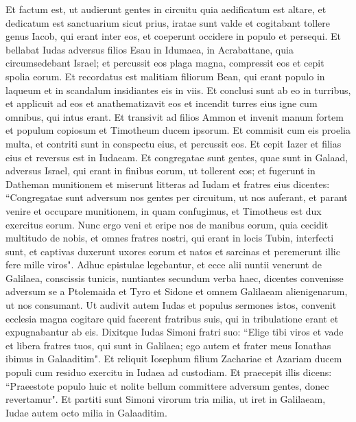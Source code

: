 \begin{biblechapter}  
\verse Et factum est, ut audierunt gentes in circuitu quia aedificatum est altare, et dedicatum est sanctuarium sicut prius, iratae sunt valde 
\verse et cogitabant tollere genus Iacob, qui erant inter eos, et coeperunt occidere in populo et persequi. 
\verse Et bellabat Iudas adversus filios Esau in Idumaea, in Acrabattane, quia circumsedebant Israel; et percussit eos plaga magna, compressit eos et cepit spolia eorum. 
\verse Et recordatus est malitiam filiorum Bean, qui erant populo in laqueum et in scandalum insidiantes eis in viis. 
\verse Et conclusi sunt ab eo in turribus, et applicuit ad eos et anathematizavit eos et incendit turres eius igne cum omnibus, qui intus erant. 
\verse Et transivit ad filios Ammon et invenit manum fortem et populum copiosum et Timotheum ducem ipsorum. 
\verse Et commisit cum eis proelia multa, et contriti sunt in conspectu eius, et percussit eos. 
\verse Et cepit Iazer et filias eius et reversus est in Iudaeam. 
\verse Et congregatae sunt gentes, quae sunt in Galaad, adversus Israel, qui erant in finibus eorum, ut tollerent eos; et fugerunt in Datheman munitionem 
\verse et miserunt litteras ad Iudam et fratres eius dicentes: “Congregatae sunt adversum nos gentes per circuitum, ut nos auferant, 
\verse et parant venire et occupare munitionem, in quam confugimus, et Timotheus est dux exercitus eorum. 
\verse Nunc ergo veni et eripe nos de manibus eorum, quia cecidit multitudo de nobis, 
\verse et omnes fratres nostri, qui erant in locis Tubin, interfecti sunt, et captivas duxerunt uxores eorum et natos et sarcinas et peremerunt illic fere mille viros". 
\verse Adhuc epistulae legebantur, et ecce alii nuntii venerunt de Galilaea, conscissis tunicis, nuntiantes secundum verba haec, 
\verse dicentes convenisse adversum se a Ptolemaida et Tyro et Sidone et omnem Galilaeam alienigenarum, ut nos consumant. 
\verse Ut audivit autem Iudas et populus sermones istos, convenit ecclesia magna cogitare quid facerent fratribus suis, qui in tribulatione erant et expugnabantur ab eis. 
\verse Dixitque Iudas Simoni fratri suo: “Elige tibi viros et vade et libera fratres tuos, qui sunt in Galilaea; ego autem et frater meus Ionathas ibimus in Galaaditim". 
\verse Et reliquit Iosephum filium Zachariae et Azariam ducem populi cum residuo exercitu in Iudaea ad custodiam.  
\verse Et praecepit illis dicens: “Praeestote populo huic et nolite bellum committere adversum gentes, donec revertamur". 
\verse Et partiti sunt Simoni virorum tria milia, ut iret in Galilaeam, Iudae autem octo milia in Galaaditim.  

\end{biblechapter}
